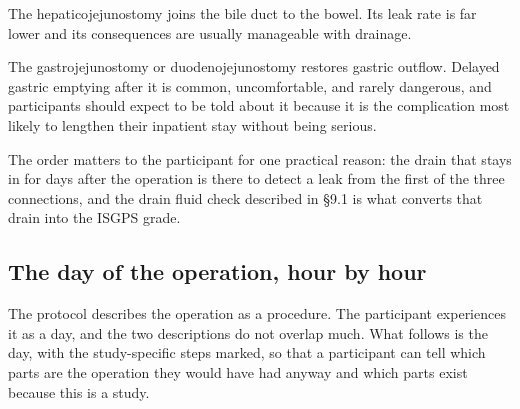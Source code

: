 The hepaticojejunostomy joins the bile duct to the bowel. Its leak rate is far
lower and its consequences are usually manageable with drainage.

The gastrojejunostomy or duodenojejunostomy restores gastric outflow. Delayed
gastric emptying after it is common, uncomfortable, and rarely dangerous, and
participants should expect to be told about it because it is the complication
most likely to lengthen their inpatient stay without being serious.

The order matters to the participant for one practical reason: the drain that
stays in for days after the operation is there to detect a leak from the first
of the three connections, and the drain fluid check described in \S 9.1 is what
converts that drain into the ISGPS grade.

\subsection{The day of the operation, hour by hour}

The protocol describes the operation as a procedure. The participant
experiences it as a day, and the two descriptions do not overlap much. What
follows is the day, with the study-specific steps marked, so that a participant
can tell which parts are the operation they would have had anyway and which
parts exist because this is a study.

\vspace{0.30em}

